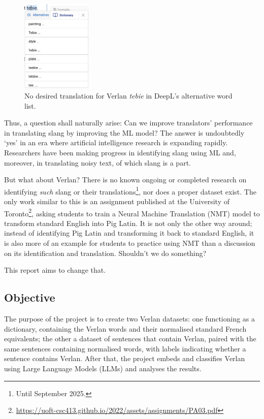 \documentclass[12pt]{article}
\begin{document}
\begin{figure}[H]
\centering
\includegraphics[width=0.3\textwidth]{figures/deepl_alt_text.png}
\caption{\label{fig:deepl_alt_text}No desired translation for Verlan \textit{tebie} in DeepL's alternative word list.}
\end{figure}

Thus, a question shall naturally arise: Can we improve translators' performance in translating slang by improving the ML model? The answer is undoubtedly `yes' in an era where artificial intelligence research is expanding rapidly. Researchers have been making progress in identifying slang using ML\cite{pei2019slang} and, moreover, in translating noisy text, of which slang is a part\cite{michel2018mtnt}. 

But what about Verlan? There is no known ongoing or completed research on identifying \textit{such} slang or their translations\footnote{Until September 2025.}, nor does a proper dataset exist. The only work similar to this is an assignment published at the University of Toronto\footnote{\url{https://uoft-csc413.github.io/2022/assets/assignments/PA03.pdf}}, asking students to train a Neural Machine Translation (NMT) model to transform standard English into Pig Latin. It is not only the other way around; instead of identifying Pig Latin and transforming it back to standard English, it is also more of an example for students to practice using NMT than a discussion on its identification and translation. Shouldn't we do something?

This report aims to change that.

\subsection{Objective}

The purpose of the project is to create two Verlan datasets: one functioning as a dictionary, containing the Verlan words and their normalised standard French equivalents; the other a dataset of sentences that contain Verlan, paired with the same sentences containing normalised words, with labels indicating whether a sentence contains Verlan. After that, the project embeds and classifies Verlan using Large Language Models (LLMs) and analyses the results.
\end{document}
